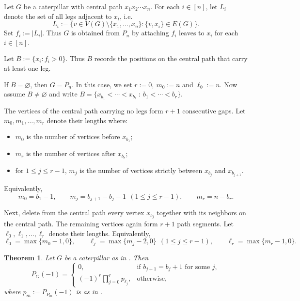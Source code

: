 \documentclass[12pt]{amsart}
\theoremstyle{plain}
\newtheorem{thm}{Theorem}[section]
\theoremstyle{definition}
\begin{document}
\begin{notation}\label{not:caterpillar}
Let \(G\) be a caterpillar with central path $x_1x_2\cdots x_n$.
For each \(i\in [n]\), let \(L_i\) denote the set of all legs adjacent to \(x_i\), i.e.
\[
L_i:=\{ v\in V(G)\setminus \{x_1,\dots,x_n\} : \{v,x_i\}\in E(G) \}.
\]
Set \(f_i:=|L_i|\). Thus
\(G\) is obtained from \(P_n\) by attaching \(f_i\) leaves to \(x_i\) for each
\(i\in [n]\).

Let $B:=\{ x_i: f_i>0 \}$.
Thus \(B\) records the positions on the central path that carry at least one leg.

If \(B=\varnothing\), then \(G=P_n\). In this case, we set $r:=0, ~m_0:=n$ and $\ell_0:=n$. Now assume \(B\neq \varnothing\) and write $B=\{x_{b_1}<\cdots<x_{b_r} ~:~ b_1<\cdots<b_r\}$.


The vertices of the central path carrying no legs form \(r+1\) consecutive
gaps. Let $m_0,m_1,\dots,m_r$
denote their lengths where:
\begin{itemize}
\item \(m_0\) is the number of vertices before \(x_{b_1}\);
\item \(m_r\) is the number of vertices after \(x_{b_r}\);
\item for \(1\le j\le r-1\), \(m_j\) is the number of vertices strictly between
\(x_{b_j}\) and \(x_{b_{j+1}}\).
\end{itemize}
Equivalently,
\[
m_0=b_1-1,\qquad
m_j=b_{j+1}-b_j-1 \ \ (1\le j\le r-1),\qquad
m_r=n-b_r.
\]

Next, delete from the central path every vertex \(x_{b_j}\) together with its
neighbors on the central path. The remaining vertices again form \(r+1\) path
segments. Let $\ell_0,\ell_1,\dots,\ell_r$
denote their lengths. Equivalently,
\[
\ell_0=\max\{m_0-1,0\},\qquad
\ell_j=\max\{m_j-2,0\}\ \ (1\le j\le r-1),\qquad
\ell_r=\max\{m_r-1,0\}.
\]
\end{notation}




\begin{thm}\label{thm:caterpillar-minus-one}
Let \(G\) be a caterpillar as in . Then
\[
P_G(-1)=
\begin{cases}
0, & \text{if } b_{j+1}=b_j+1 \text{ for some }j,\\[4pt]
(-1)^r\displaystyle\prod_{j=0}^r p_{\ell_j}, & \text{otherwise},
\end{cases}
\]
where \(p_m:=P_{P_m}(-1)\) is as in .
\end{thm}
\end{document}
